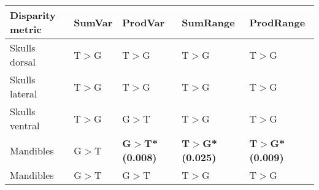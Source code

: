 
\begin{tabular}[t]{l l l l l  }		
\hline
\textbf{Disparity metric} & \textbf{SumVar} & \textbf{ProdVar} & \textbf{SumRange} & \textbf{ProdRange} \\
\hline
Skulls dorsal & T$>$G & T$>$G & T$>$G & T$>$G \\
Skulls lateral	& T$>$G & T$>$G & T$>$G & T$>$G \\
Skulls ventral & T$>$G & G$>$T & T$>$G & T$>$G \\
Mandibles & G$>$T & \textbf{G$>$T* (0.008)} & \textbf{T$>$G* (0.025)} & \textbf{T$>$G* (0.009)}\\
Mandibles & G$>$T & G$>$T & T$>$G & T$>$G\\
\hline
\end{tabular}